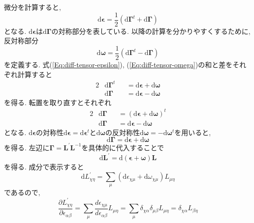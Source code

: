 微分を計算すると,
\begin{equation}
  \mathrm{d} \bm{\epsilon}
  =
  \frac{1}{2}
  \left( \mathrm{d}\bm{\Gamma}^{t} + \mathrm{d}\bm{\Gamma} \right)
  \label{Eq:diff-tensor-epsilon}
\end{equation}
となる.
$\mathrm{d}\bm{\epsilon}$は$\mathrm{d}\bm{\Gamma}$の対称部分を表している.
以降の計算を分かりやすくするために, 反対称部分
\begin{equation}
  \mathrm{d}\bm{\omega}
  =
  \frac{1}{2}
  \left( \mathrm{d}\bm{\Gamma}^{t} - \mathrm{d}\bm{\Gamma} \right)
  \label{Eq:diff-tensor-omega}
\end{equation}
を定義する.
式(\ref{Eq:diff-tensor-epsilon}), (\ref{Eq:diff-tensor-omega})の和と差をそれぞれ計算すると
\begin{alignat}{2}
  &\mathrm{d}\bm{\Gamma}^{t} &&= \mathrm{d}\bm{\epsilon} + \mathrm{d}\bm{\omega} \\
  &\mathrm{d}\bm{\Gamma}     &&= \mathrm{d}\bm{\epsilon} - \mathrm{d}\bm{\omega}
\end{alignat}
を得る. 転置を取り直すとそれぞれ
\begin{alignat}{2}
&\mathrm{d}\bm{\Gamma} &&= (\mathrm{d}\bm{\epsilon} + \mathrm{d}\bm{\omega})^{t} \\
&\mathrm{d}\bm{\Gamma} &&=  \mathrm{d}\bm{\epsilon} - \mathrm{d}\bm{\omega}
\end{alignat}
となる.
$\mathrm{d}{\bm{\epsilon}}$の対称性$\mathrm{d}\bm{\epsilon} = \mathrm{d}\bm{\epsilon}^{t}$と$\mathrm{d}{\bm{\omega}}$の反対称性$\mathrm{d}\bm{\omega} = -\mathrm{d}\bm{\omega}^{t}$を用いると,
\begin{equation}
  \mathrm{d}\bm{\Gamma} = \mathrm{d} \bm{\epsilon} + \mathrm{d} \bm{\omega}
\end{equation}
を得る. 左辺に$\bm{\Gamma} = \bm{L}^{\prime}\bm{L}^{-1}$を具体的に代入することで
\begin{equation}
  \mathrm{d} \bm{L}^{\prime}
  =
  \mathrm{d} (\bm{\epsilon} + \bm{\omega}) \bm{L}
\end{equation}
を得る. 成分で表示すると
\begin{equation}
  \mathrm{d} L_{\chi\eta}^{\prime}
  =
  \sum_{\mu}
  (\mathrm{d}\epsilon_{\chi\mu} + \mathrm{d}\omega_{\chi\mu})
  L_{\mu\eta}
\end{equation}
であるので, 
\begin{equation}
  \frac{\partial L_{\chi\eta}^{\prime}}{\partial \epsilon_{\alpha\beta}}
  =
  \sum_{\mu}
  \frac{d \epsilon_{\chi\mu}}{d \epsilon_{\alpha\beta}} L_{\mu\eta}
  =
  \sum_{\mu}
  \delta_{\chi\alpha} \delta_{\mu\beta} L_{\mu\eta}
  =
  \delta_{\chi\alpha} L_{\beta\eta}
\end{equation}
